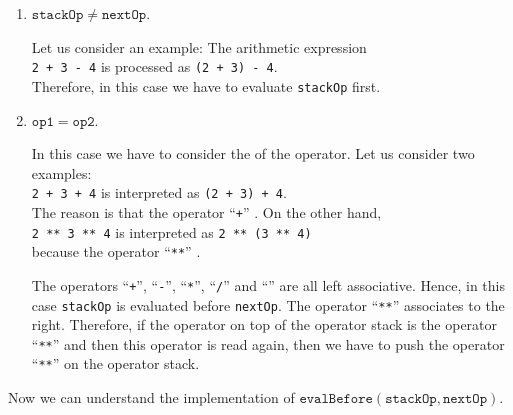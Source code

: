 \begin{enumerate}
\item $\mathtt{stackOp} \not= \mathtt{nextOp}$.

      Let us consider an example:  The arithmetic expression 
      \\[0.2cm]
      \hspace*{1.3cm} 
      \texttt{2 + 3 - 4} \quad is processed as \quad \texttt{(2 + 3) - 4}. 
      \\[0.2cm]
      Therefore, in this case we have to evaluate \texttt{stackOp} first.
\item $\mathtt{op1} = \mathtt{op2}$.

      In this case we have to consider the  of the operator.
      Let us consider two examples: \\[0.2cm]
      \hspace*{1.3cm} \texttt{2 + 3 + 4} \quad is interpreted as \quad \texttt{(2 + 3) + 4}. \\[0.2cm]
      The reason is that the operator ``\texttt{+}'' .
      On the other hand, \\[0.2cm]
      \hspace*{1.3cm} 
      \texttt{2 \texttt{**} 3 \texttt{**} 4}  \quad is interpreted as \quad \texttt{2 \texttt{**} (3 \texttt{**} 4)}
      \\[0.2cm]
      because the operator ``\texttt{**}'' .

      The operators ``\texttt{+}'', ``\texttt{-}'', ``\texttt{*}'', ``\texttt{/}'' and 
      ``\texttt{}'' are all left associative.  Hence, in this case \texttt{stackOp} is
      evaluated before \texttt{nextOp}.
      The operator ``\texttt{**}'' associates to the right. Therefore, if
      the operator on top of the operator stack is the operator ``\texttt{**}'' and then this operator
      is read again, then we have to push the  operator ``\texttt{**}'' on the operator stack.
\end{enumerate}
Now we can understand the implementation of $\texttt{evalBefore}(\mathtt{stackOp},\mathtt{nextOp})$.
